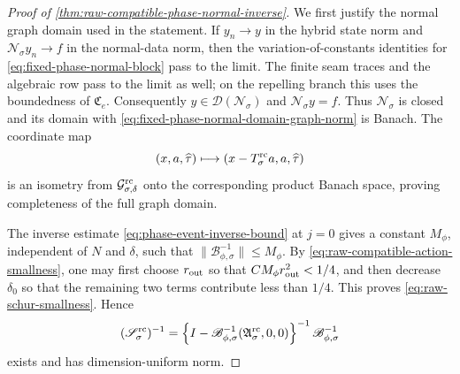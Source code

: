 \begin{proof}[Proof of
\cref{thm:raw-compatible-phase-normal-inverse}]
We first justify the normal graph domain used in the statement.  If
\(y_n\to y\) in the hybrid state norm and
\(\mathscr N_\sigma y_n\to f\) in the normal-data norm, then the
variation-of-constants identities for
\cref{eq:fixed-phase-normal-block} pass to the limit.  The finite seam
traces and the algebraic row pass to the limit as well; on the repelling
branch this uses the boundedness of \(\mathfrak C_e\).
Consequently \(y\in\mathcal D(\mathscr N_\sigma)\) and
\(\mathscr N_\sigma y=f\).  Thus \(\mathscr N_\sigma\) is closed and its
domain with \cref{eq:fixed-phase-normal-domain-graph-norm} is Banach.
The coordinate map
\[
 (x,a,\widehat\tau)\longmapsto
 (x-T_\sigma^{\rm rc}a,a,\widehat\tau)
\]
is an isometry from \(\mathcal G_{\sigma,\delta}^{\rm rc}\) onto the
corresponding product Banach space, proving completeness of the full graph
domain.

The inverse estimate
\cref{eq:phase-event-inverse-bound} at \(j=0\) gives a constant
\(M_\phi\), independent of \(N\) and \(\delta\), such that
\(\|\mathscr B_{\phi,\sigma}^{-1}\|\le M_\phi\).
By \cref{eq:raw-compatible-action-smallness}, one may first choose
\(r_{\rm out}\) so that \(CM_\phi r_{\rm out}^2<1/4\), and then decrease
\(\delta_0\) so that the remaining two terms contribute less than \(1/4\).
This proves \cref{eq:raw-schur-smallness}.  Hence
\begin{equation}
 (\mathscr S_\sigma^{\rm rc})^{-1}
 =\left\{I-\mathscr B_{\phi,\sigma}^{-1}
       (\mathfrak A_\sigma^{\rm rc},0,0)\right\}^{-1}
       \mathscr B_{\phi,\sigma}^{-1}              \label{eq:raw-schur-neumann-inverse}
\end{equation}
exists and has dimension-uniform norm.


\end{proof}
